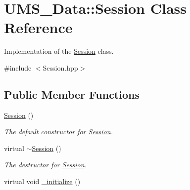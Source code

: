 \hypertarget{classUMS__Data_1_1Session}{
\section{UMS\_\-Data::Session Class Reference}
\label{classUMS__Data_1_1Session}
}


Implementation of the \hyperlink{classUMS__Data_1_1Session}{Session} class.  




{\ttfamily \#include $<$Session.hpp$>$}

\subsection*{Public Member Functions}
\begin{DoxyCompactItemize}
\item 
\hypertarget{classUMS__Data_1_1Session_a4b3494f5d89c89ffd5f74302f7ed38cb}{
\hyperlink{classUMS__Data_1_1Session_a4b3494f5d89c89ffd5f74302f7ed38cb}{Session} ()}
\label{classUMS__Data_1_1Session_a4b3494f5d89c89ffd5f74302f7ed38cb}

\begin{DoxyCompactList}\small\item\em The default constructor for \hyperlink{classUMS__Data_1_1Session}{Session}. \item\end{DoxyCompactList}\item 
\hypertarget{classUMS__Data_1_1Session_aab9a619a9cb1301fd2a362ce2729171b}{
virtual \hyperlink{classUMS__Data_1_1Session_aab9a619a9cb1301fd2a362ce2729171b}{$\sim$Session} ()}
\label{classUMS__Data_1_1Session_aab9a619a9cb1301fd2a362ce2729171b}

\begin{DoxyCompactList}\small\item\em The destructor for \hyperlink{classUMS__Data_1_1Session}{Session}. \item\end{DoxyCompactList}\item 
\hypertarget{classUMS__Data_1_1Session_a29576ae39e57407a2025e30fd4633996}{
virtual void \hyperlink{classUMS__Data_1_1Session_a29576ae39e57407a2025e30fd4633996}{\_\-initialize} ()}
\label{classUMS__Data_1_1Session_a29576ae39e57407a2025e30fd4633996}


\end{DoxyCompactItemize}
